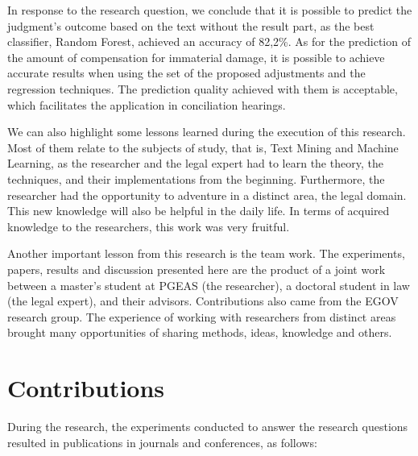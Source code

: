 In response to the research question, we conclude that it is possible to predict the judgment's outcome based on the text without the  result part, as the best classifier, Random Forest, achieved an accuracy of 82,2\%. 
As for the prediction of the amount of compensation for immaterial damage, it is possible to achieve accurate results  when using the set of the proposed adjustments and the regression techniques. The prediction quality achieved with them is acceptable, which facilitates the application in conciliation hearings.


We can also highlight some lessons learned during the execution of this research.
Most of them relate to the subjects of study, that is, Text Mining and Machine Learning, as the researcher and the legal expert had to learn the theory, the techniques, and their implementations from the beginning. Furthermore,  the researcher had the opportunity to adventure in a distinct area, the legal domain. This new knowledge will also be helpful in the daily life. In terms of acquired knowledge to the researchers, this work was very fruitful.  

Another important lesson from this research is the team work. The experiments, papers, results and discussion presented here  are the product of a joint work between a master's student at PGEAS (the researcher), a doctoral student in law (the legal expert), and their advisors. Contributions also came from the \gls{EGOV} research group. The experience of working with researchers from distinct areas brought many opportunities of sharing methods, ideas, knowledge and others. 


\section{Contributions}

During the research, the experiments conducted to answer the research questions resulted in publications in journals and conferences, as follows:


